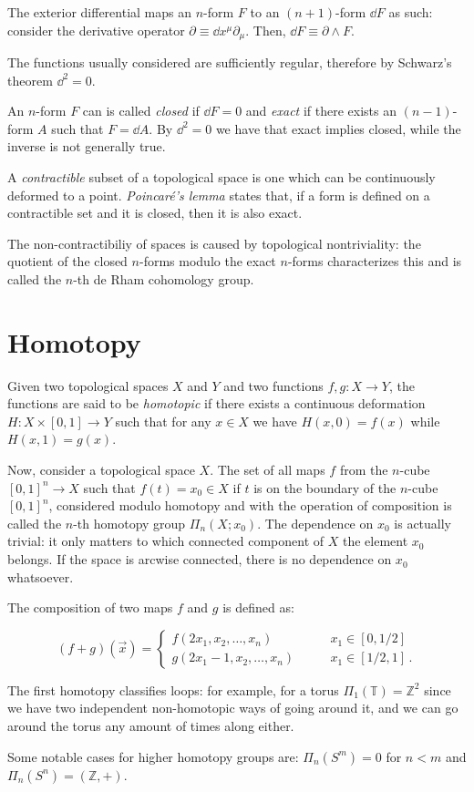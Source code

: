 \documentclass[main.tex]{subfiles}
\begin{document}
The exterior differential maps an \(n\)-form \(F\) to an \((n+1)\)-form \(\dd{F}\) as such:
consider the derivative operator \(\partial \equiv \dd{x^{\mu}} \partial _\mu\).
Then, \(\dd{F} \equiv \partial \wedge F\).

The functions usually considered are sufficiently regular, therefore by Schwarz's theorem \(\dd^2 = 0\).

An \(n\)-form \(F\) can is called \emph{closed} if \(\dd{F}= 0 \) and \emph{exact} if there exists an \((n-1)\)-form \(A\) such that \(F = \dd{A}\).
By \(\dd^2=0\) we have that exact implies closed, while the inverse is not generally true.

A \emph{contractible} subset of a topological space is one which can be continuously deformed to a point.
\emph{Poincaré's lemma} states that, if a form is defined on a contractible set and it is closed, then it is also exact.

The non-contractibiliy of spaces is caused by topological nontriviality: the quotient of the closed \(n\)-forms modulo the exact \(n\)-forms characterizes this and is called the \(n\)-th de Rham cohomology group. 

\section{Homotopy} \label{sec:homotopy}

Given two topological spaces \(X\) and \(Y\) and two functions \(f, g \colon X \rightarrow Y\), the functions are said to be \emph{homotopic} if there exists a continuous deformation \(H \colon X \times [0,1] \rightarrow Y\) such that for any \(x \in X\) we have \(H(x, 0) = f(x)\) while \(H(x, 1) = g(x)\).

Now, consider a topological space \(X\).
The set of all maps \(f\) from the \(n\)-cube \([0,1]^n \rightarrow X\) such that  \(f(t) = x_0 \in X\) if \(t\) is on the boundary of the \(n\)-cube \([0,1]^{n}\), considered modulo homotopy and with the operation of composition is called the \(n\)-th homotopy group \(\Pi_n (X; x_0)\).
The dependence on \(x_0\) is actually trivial: it only matters to which connected component of \(X\) the element \(x_0\) belongs. If the space is arcwise connected, there is no dependence on \(x_0 \) whatsoever.

The composition of two maps \(f\) and \(g\) is defined as:

\begin{equation}
  (f+g) (\vec{x} ) = \begin{cases}
  f(2x_1, x_2, \dots, x_n) \qquad & x_1 \in [0, 1/2 ] \\
  g(2x_1-1, x_2, \dots, x_n) \qquad & x_1 \in [1/2, 1] \,.
  \end{cases}
\end{equation}

The first homotopy classifies loops: for example, for a torus \(\Pi_{1} (\mathbb{T}) = \mathbb{Z}^2\) since we have two independent non-homotopic  ways of going around it, and we can go around the torus any amount of times along either.

Some notable cases for higher homotopy groups are: \(\Pi_n (S^m) = 0 \) for \(n<m\) and \(\Pi_n (S^n) = (\mathbb Z, +)\).
\end{document}
